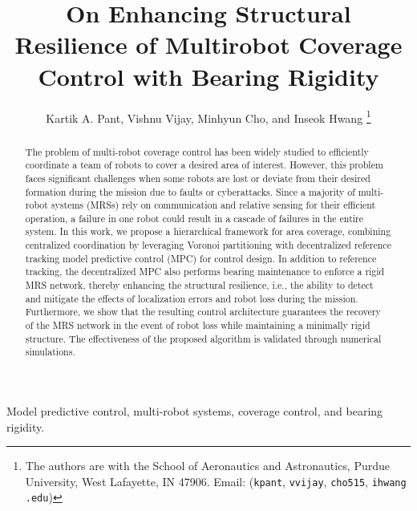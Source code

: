 \title{On Enhancing Structural Resilience of Multirobot Coverage Control with Bearing Rigidity}
\author{ 
Kartik A. Pant, Vishnu Vijay, Minhyun Cho, and Inseok Hwang
\thanks{The authors are with the School of Aeronautics and Astronautics, Purdue University,
West Lafayette, IN 47906. Email: ({\tt\small kpant}, {\tt\small vvijay}, {\tt\small cho515}, {\tt\small ihwang} {\tt \small@purdue.edu})}}
\maketitle
\thispagestyle{empty}
\begin{abstract}   
The problem of multi-robot coverage control has been widely studied to efficiently coordinate a team of robots to cover a desired area of interest. However, this problem faces significant challenges when some robots are lost or deviate from their desired formation during the mission due to faults or cyberattacks. Since a majority of multi-robot systems (MRSs) rely on communication and relative sensing for their efficient operation, a failure in one robot could result in a cascade of failures in the entire system. In this work, we propose a hierarchical framework for area coverage, combining centralized coordination by leveraging Voronoi partitioning with decentralized reference tracking model predictive control (MPC) for control design. In addition to reference tracking, the decentralized MPC also performs bearing maintenance to enforce a rigid MRS network, thereby enhancing the structural resilience, i.e., the ability to detect and mitigate the effects of localization errors and robot loss during the mission. Furthermore, we show that the resulting control architecture guarantees the recovery of the MRS network in the event of robot loss while maintaining a minimally rigid structure. The effectiveness of the proposed algorithm is validated through numerical simulations.     
\end{abstract}
\begin{keywords}
Model predictive control, multi-robot systems, coverage control, and bearing rigidity.
\end{keywords}